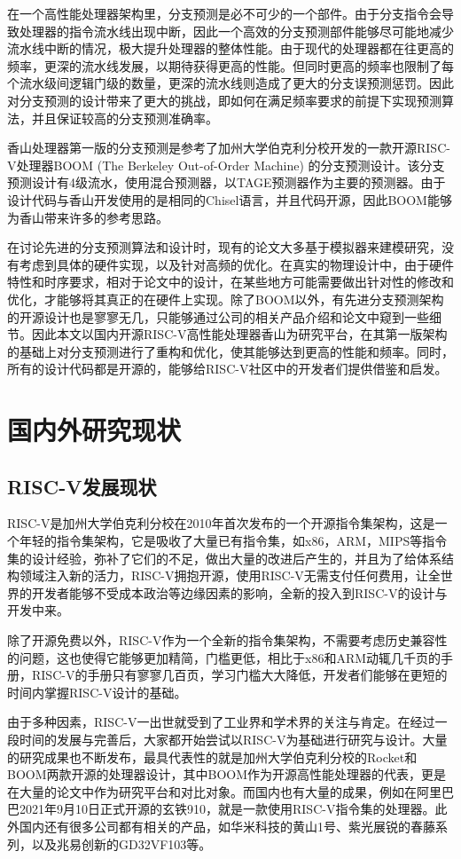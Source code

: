 在一个高性能处理器架构里，分支预测是必不可少的一个部件。由于分支指令会导致处理器的指令流水线出现中断，因此一个高效的分支预测部件能够尽可能地减少流水线中断的情况，极大提升处理器的整体性能。由于现代的处理器都在往更高的频率，更深的流水线发展，以期待获得更高的性能。但同时更高的频率也限制了每个流水级间逻辑门级的数量，更深的流水线则造成了更大的分支误预测惩罚。因此对分支预测的设计带来了更大的挑战，即如何在满足频率要求的前提下实现预测算法，并且保证较高的分支预测准确率。

香山处理器第一版的分支预测是参考了加州大学伯克利分校开发的一款开源RISC-V处理器BOOM (The Berkeley Out-of-Order Machine) 的分支预测设计\cite{boom-spec}。该分支预测设计有4级流水，使用混合预测器，以TAGE预测器作为主要的预测器。由于设计代码与香山开发使用的是相同的Chisel语言，并且代码开源，因此BOOM能够为香山带来许多的参考思路。

在讨论先进的分支预测算法和设计时，现有的论文大多基于模拟器来建模研究，没有考虑到具体的硬件实现，以及针对高频的优化。在真实的物理设计中，由于硬件特性和时序要求，相对于论文中的设计，在某些地方可能需要做出针对性的修改和优化，才能够将其真正的在硬件上实现。除了BOOM以外，有先进分支预测架构的开源设计也是寥寥无几，只能够通过公司的相关产品介绍和论文中窥到一些细节。因此本文以国内开源RISC-V高性能处理器香山为研究平台，在其第一版架构的基础上对分支预测进行了重构和优化，使其能够达到更高的性能和频率。同时，所有的设计代码都是开源的，能够给RISC-V社区中的开发者们提供借鉴和启发。

\section{国内外研究现状}


\subsection{RISC-V发展现状}
RISC-V是加州大学伯克利分校在2010年首次发布的一个开源指令集架构，这是一个年轻的指令集架构，它是吸收了大量已有指令集，如x86，ARM，MIPS等指令集的设计经验，弥补了它们的不足，做出大量的改进后产生的，并且为了给体系结构领域注入新的活力，RISC-V拥抱开源，使用RISC-V无需支付任何费用，让全世界的开发者能够不受成本政治等边缘因素的影响，全新的投入到RISC-V的设计与开发中来。

除了开源免费以外，RISC-V作为一个全新的指令集架构，不需要考虑历史兼容性的问题，这也使得它能够更加精简，门槛更低，相比于x86和ARM动辄几千页的手册，RISC-V的手册只有寥寥几百页，学习门槛大大降低，开发者们能够在更短的时间内掌握RISC-V设计的基础。

由于多种因素，RISC-V一出世就受到了工业界和学术界的关注与肯定。在经过一段时间的发展与完善后，大家都开始尝试以RISC-V为基础进行研究与设计。大量的研究成果也不断发布，最具代表性的就是加州大学伯克利分校的Rocket和BOOM两款开源的处理器设计，其中BOOM作为开源高性能处理器的代表，更是在大量的论文中作为研究平台和对比对象。而国内也有大量的成果，例如在阿里巴巴2021年9月10日正式开源的玄铁910，就是一款使用RISC-V指令集的处理器。此外国内还有很多公司都有相关的产品，如华米科技的黄山1号、紫光展锐的春藤系列，以及兆易创新的GD32VF103等。

